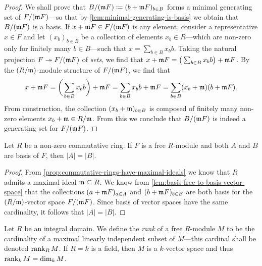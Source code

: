 \begin{proof}
We shall prove that \(B/(\mathfrak{m} F) \coloneq (b + \mathfrak{m} F)_{b \in B}\)
forms a minimal generating set of \(F/(\mathfrak{m} F)\)---so that by
\cref{lem:minimal-generating-is-basis} we obtain that \(B/(\mathfrak{m} F)\) is a
basis. If \(x + \mathfrak{m} F \in F/(\mathfrak{m} F)\) is any element, consider a
representative \(x \in F\) and let \((x_b)_{b \in B}\) be a collection of
elements \(x_b \in R\)---which are non-zero only for finitely many
\(b \in B\)---such that \(x = \sum_{b \in B} x_b b\). Taking the natural
projection \(F \twoheadrightarrow F/(\mathfrak{m} F)\) of \emph{sets}, we find that
\(x + \mathfrak{m} F = \big( \sum_{b \in B} x_b b \big) + \mathfrak{m} F\). By the
\((R/\mathfrak{m})\)-module structure of \(F/(\mathfrak{m} F)\), we find that
\[
x + \mathfrak{m} F
= \bigg( \sum_{b \in B} x_b b \bigg) + \mathfrak{m} F
= \sum_{b \in B} x_b b + \mathfrak{m} F
= \sum_{b \in B} (x_b + \mathfrak{m}) (b + \mathfrak{m} F).
\]
From construction, the collection \((x_b + \mathfrak{m})_{b \in B}\) is composed of
finitely many non-zero elements \(x_b + \mathfrak{m} \in R/\mathfrak{m}\). From this we
conclude that \(B/(\mathfrak{m} F)\) is indeed a generating set for
\(F/(\mathfrak{m} F)\).

\end{proof}

\begin{proposition}
\label{prop:comm-ring-basis-have-same-cardinality}
Let \(R\) be a non-zero commutative ring. If \(F\) is a free \(R\)-module and
both \(A\) and \(B\) are basis of \(F\), then \(|A| = |B|\).
\end{proposition}

\begin{proof}
From \cref{prop:commutative-rings-have-maximal-ideals} we know that \(R\) admits
a maximal ideal \(\mathfrak{m} \subseteq R\). We know from
\cref{lem:basis-free-to-basis-vector-space} that the collections \((a + \mathfrak{m}
F)_{a \in A}\) and \((b + \mathfrak{m} F)_{b \in B}\) are both basis for the
\((R/\mathfrak{m})\)-vector space \(F/(\mathfrak{m} F)\). Since basis of vector spaces
have the same cardinality, it follows that \(|A| = |B|\).
\end{proof}

\begin{definition}[Rank]
\label{def:rank-of-module}
Let \(R\) be an integral domain. We define the \emph{rank} of a free
\(R\)-module \(M\) to be the cardinality of a maximal linearly independent
subset of \(M\)---this cardinal shall be denoted \(\operatorname{rank}_R M\). If \(R = k\) is a
field, then \(M\) is a \(k\)-vector space and thus \(\operatorname{rank}_k M = \dim_k M\).
\end{definition}

